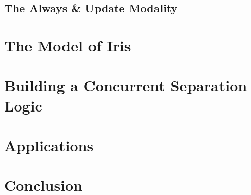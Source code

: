\documentclass{amsart}
\begin{document}
\subsection{The Always \& Update Modality}\label{subsec:always}

\section{The Model of Iris}\label{sec:model}

\section{Building a Concurrent Separation Logic}\label{sec:encoding}

\section{Applications}\label{sec:applications}

\section{Conclusion}\label{sec:conclusions}



{}
\end{document}
